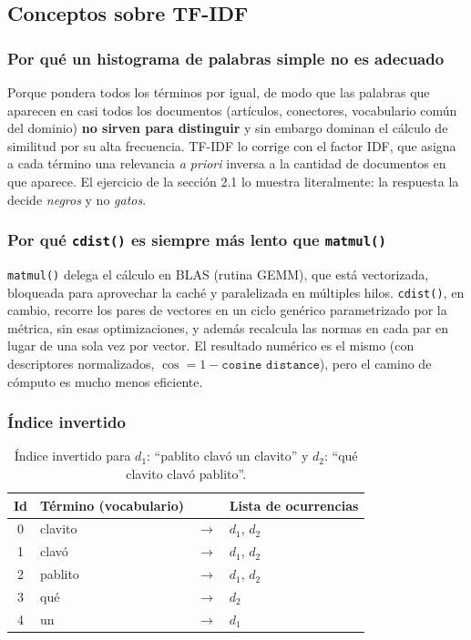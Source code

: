 \documentclass[11pt, a4paper]{article}
\newcommand{\code}[1]{\texttt{#1}}
\begin{document}
\subsection{Conceptos sobre TF-IDF}

\subsubsection{Por qué un histograma de palabras simple no es adecuado}

Porque pondera todos los términos por igual, de modo que las palabras que aparecen en casi todos los
documentos (artículos, conectores, vocabulario común del dominio) \textbf{no sirven para distinguir}
y sin embargo dominan el cálculo de similitud por su alta frecuencia. TF-IDF lo corrige con el factor
IDF, que asigna a cada término una relevancia \textit{a priori} inversa a la cantidad de documentos en
que aparece. El ejercicio de la sección 2.1 lo muestra literalmente: la respuesta la decide
\textit{negros} y no \textit{gatos}.

\subsubsection{Por qué \code{cdist()} es siempre más lento que \code{matmul()}}

\code{matmul()} delega el cálculo en BLAS (rutina GEMM), que está vectorizada, bloqueada para
aprovechar la caché y paralelizada en múltiples hilos. \code{cdist()}, en cambio, recorre los pares
de vectores en un ciclo genérico parametrizado por la métrica, sin esas optimizaciones, y además
recalcula las normas en cada par en lugar de una sola vez por vector. El resultado numérico es el
mismo (con descriptores normalizados, $\cos = 1 - \texttt{cosine distance}$), pero el camino de
cómputo es mucho menos eficiente.

\subsubsection{Índice invertido}

\begin{table}[H]
\centering
\caption{Índice invertido para $d_1$: ``pablito clavó un clavito'' y $d_2$: ``qué clavito clavó pablito''.}
\small
\renewcommand{\arraystretch}{1.2}
\begin{tabular}{@{}clcl@{}}
\toprule
\textbf{Id} & \textbf{Término (vocabulario)} & & \textbf{Lista de ocurrencias} \\
\midrule
0 & clavito & $\rightarrow$ & $d_1$, $d_2$ \\
1 & clavó   & $\rightarrow$ & $d_1$, $d_2$ \\
2 & pablito & $\rightarrow$ & $d_1$, $d_2$ \\
3 & qué     & $\rightarrow$ & $d_2$ \\
4 & un      & $\rightarrow$ & $d_1$ \\
\bottomrule
\end{tabular}
\end{table}
\end{document}

